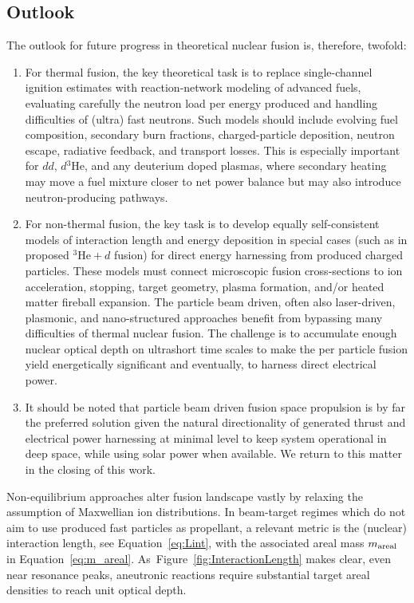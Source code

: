 \documentclass[particles,article,accept,pdftex,moreauthors]{Definitions/mdpi}
\begin{document}
\subsection{Outlook}
The outlook for future progress in theoretical nuclear fusion is, therefore, twofold:
\begin{enumerate}
\item 
For thermal fusion, the key theoretical task is to replace single-channel ignition estimates with reaction-network modeling of advanced fuels, evaluating carefully the neutron load per energy produced and handling difficulties of (ultra) fast neutrons. Such models should include evolving fuel composition, secondary burn fractions, charged-particle deposition, neutron escape, radiative feedback, and transport losses. This is especially important for $dd$, $d{}^3\mathrm{He}$, and any deuterium doped plasmas, where secondary heating may move a fuel mixture closer to net power balance but may also introduce neutron-producing pathways.
\item 
For non-thermal fusion, the key task is to develop equally self-consistent models of interaction length and energy deposition in special cases (such as in proposed ${}^3\mathrm{He}+d$ fusion) for direct energy harnessing from produced charged particles. These models must connect microscopic fusion cross-sections to ion acceleration, stopping, target geometry, plasma formation, and/or heated matter fireball expansion. The particle beam driven, often also laser-driven, plasmonic, and nano-structured approaches benefit from bypassing many difficulties of thermal nuclear fusion. The challenge is to accumulate enough nuclear optical depth on ultrashort time scales to make the per particle fusion yield energetically significant and eventually, to harness direct electrical power.
\item
It should be noted that particle beam driven fusion space propulsion is by far the preferred solution given the natural directionality of generated thrust and electrical power harnessing at minimal level to keep system operational in deep space, while using solar power when available. We return to this matter in the closing of this work.
\end{enumerate}

Non-equilibrium approaches alter fusion landscape vastly by relaxing the assumption of Maxwellian ion distributions. In beam-target regimes which do not aim to use produced fast particles as propellant, a relevant metric is the (nuclear) interaction length, see Equation~\eqref{eq:Lint}, with the associated areal mass $m_{\rm areal}$ in Equation~\eqref{eq:m_areal}. As~Figure~\ref{fig:InteractionLength} makes clear, even near resonance peaks, aneutronic reactions require substantial target areal densities to reach unit optical depth.
\end{document}
